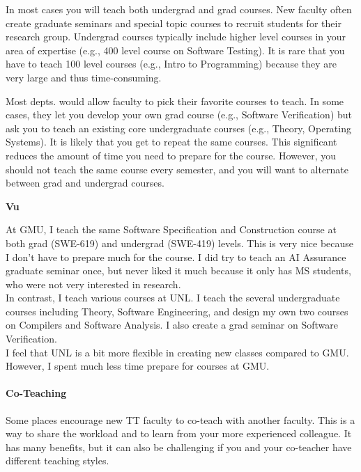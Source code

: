 \documentclass[oneside,11pt,dvipsnames]{book}
\newenvironment{commentbox}[1][]{
  \small
  \begin{mybox}
    {\small \textbf{#1}}
  }{
  \end{mybox}
}
\begin{document}
In most cases you will teach both undergrad and grad courses. New faculty often create graduate seminars and special topic courses to recruit students for their research group. Undergrad courses typically include higher level courses in your area of expertise (e.g., 400 level course on Software Testing). It is rare that you have to teach 100 level courses (e.g., Intro to Programming) because they are very large and thus time-consuming.

Most depts. would allow faculty to pick their favorite courses to teach. In some cases, they let  you develop your own grad course (e.g., Software Verification) but ask you to teach an existing core undergraduate courses (e.g., Theory, Operating Systems).
It is likely that you get to repeat the same courses. This significant reduces the amount of time you need to prepare for the course.  However, you should not teach the same course every semester, and you will want to alternate between grad and undergrad courses.


\begin{commentbox}[Vu]
    At GMU, I teach the same Software Specification and Construction course at both grad (SWE-619) and undergrad (SWE-419) levels. This is very nice because I don't have to prepare much for the course.  I did try to teach an AI Assurance graduate seminar once, but never liked it much because it only has MS students, who were not very interested in research.
    \\

    In contrast, I teach various courses at UNL. I teach the several undergraduate courses including Theory, Software Engineering, and design my own two courses on Compilers and Software Analysis. I also create a grad seminar on Software Verification.\\

    I feel that UNL is a bit more flexible in creating new classes compared to GMU.  However, I spent much less time prepare for courses at GMU.
  \end{commentbox}

\paragraph{Co-Teaching}
Some places encourage new TT faculty to co-teach with another faculty. This is a way to share the workload and to learn from your more experienced colleague. It has many benefits, but it can also be challenging if you and your co-teacher have different teaching styles.
\end{document}
